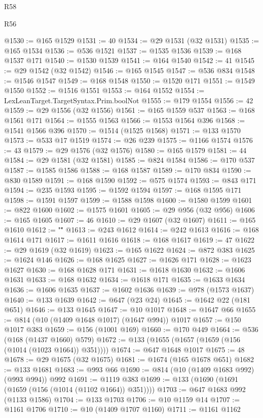 \begin{lexlean}{R58}
\begin{lexlean}{R56}
\begin{coremodule}
{{{{{{{{{{{{{{{{{{{{{{{{{{{{{{{{{{{{{{{{{{{{{{{{{{{{{{{{{{{{{{{{{{{{{{{{{{{{{{{{{{{{{{{{{{{{{{{{{{{{{{{{{{{{{{{{{{{{{{{{{{{{{{{{{{{{{{{{{{{{{{{{{{{{{{{{{{{{{{{{{{{{{{{{{{{{{{{{{{{{{{{{{{{{{{{{{{{{{{{{{{{{{{{{{{{@1530 := @165 @1529
@1531 := 40
@1534 := @29 @1531 (@32 @1531)
@1535 := @165 @1534
@1536 := @536 @1521
@1537 := @1535 @1536
@1539 := @168 @1537 @171
@1540 := @1530 @1539
@1541 := @164 @1540
@1542 := 41
@1545 := @29 @1542 (@32 @1542)
@1546 := @165 @1545
@1547 := @536 @834
@1548 := @1546 @1547
@1549 := @168 @1548
@1550 := @1520 @171
@1551 := @1549 @1550
@1552 := @1516 @1551
@1553 := @164 @1552
@1554 := LexLeanTarget.TargetSyntax.Prim.boolNot
@1555 := @179 @1554
@1556 := 42
@1559 := @29 @1556 (@32 @1556)
@1561 := @165 @1559 @537
@1563 := @168 @1561 @171
@1564 := @1555 @1563
@1566 := @1553 @1564 @396
@1568 := @1541 @1566 @396
@1570 := @1514 (@1525 @1568)
@1571 := @133 @1570
@1573 := @533 @17 @1519
@1574 := @26 @239
@1575 := @1166 @1574
@1576 := 43
@1579 := @29 @1576 (@32 @1576)
@1580 := @165 @1579
@1581 := 44
@1584 := @29 @1581 (@32 @1581)
@1585 := @824 @1584
@1586 := @170 @537
@1587 := @1585 @1586
@1588 := @168 @1587
@1589 := @170 @834
@1590 := @830 @1589
@1591 := @168 @1590
@1592 := @575 @1574
@1593 := @843 @171
@1594 := @235 @1593
@1595 := @1592 @1594
@1597 := @168 @1595 @171
@1598 := @1591 @1597
@1599 := @1588 @1598
@1600 := @1580 @1599
@1601 := @822 @1600
@1602 := @1575 @1601
@1605 := @29 @956 (@32 @956)
@1606 := @165 @1605
@1607 := 46
@1610 := @29 @1607 (@32 @1607)
@1611 := @165 @1610
@1612 := "\""
@1613 := @243 @1612
@1614 := @242 @1613
@1616 := @168 @1614 @171
@1617 := @1611 @1616
@1618 := @168 @1617
@1619 := 47
@1622 := @29 @1619 (@32 @1619)
@1623 := @165 @1622
@1624 := @872 @383
@1625 := @1624 @146
@1626 := @168 @1625
@1627 := @1626 @171
@1628 := @1623 @1627
@1630 := @168 @1628 @171
@1631 := @1618 @1630
@1632 := @1606 @1631
@1633 := @168 @1632
@1634 := @1618 @171
@1635 := @1633 @1634
@1636 := @1606 @1635
@1637 := @1602 @1636
@1639 := @978 (@1573 @1637)
@1640 := @133 @1639
@1642 := @647 (@23 @24)
@1645 := @1642 @22 (@181 @651)
@1646 := @133 @1645
@1647 := @10 @1017
@1648 := @1647 @66
@1655 := @814 (@10 (@1409 @1648 @1017) (@1647 @994)) @1017
@1657 := @150 @1017 @383
@1659 := @156 (@1001 @169)
@1660 := @170 @449
@1664 := @536 (@168 (@1437 @1660) @579)
@1672 := @133 (@1655 (@1657 (@1659 (@156 (@1014 (@1023 @1664)) @351))))
@1674 := @647 @1648 @1017
@1675 := 48
@1678 := @29 @1675 (@32 @1675)
@1681 := @1674 (@165 @1678 @651)
@1682 := @133 @1681
@1683 := @993 @66
@1690 := @814 (@10 (@1409 @1683 @992) (@993 @994)) @992
@1691 := @1119 @383
@1699 := @133 (@1690 (@1691 (@1659 (@156 (@1014 (@1102 @1664)) @351))))
@1703 := @647 @1683 @992 (@1133 @1586)
@1704 := @133 @1703
@1706 := @10 @1159 @14
@1707 := @1161 @1706
@1710 := @10 (@1409 @1707 @1160)
@1711 := @1161 @1162
}}}}}}}}}}}}}}}}}}}}}}}}}}}}}}}}}}}}}}}}}}}}}}}}}}}}}}}}}}}}}}}}}}}}}}}}}}}}}}}}}}}}}}}}}}}}}}}}}}}}}}}}}}}}}}}}}}}}}}}}}}}}}}}}}}}}}}}}}}}}}}}}}}}}}}}}}}}}}}}}}}}}}}}}}}}}}}}}}}}}}}}}}}}}}}}}}}}}}}}}}}}}}}}}}}}
\end{coremodule}
\end{lexlean}
\end{lexlean}
